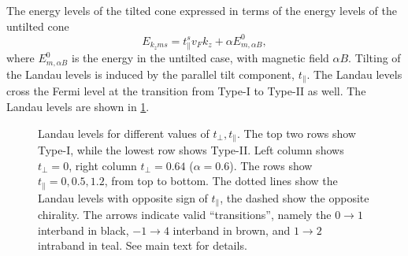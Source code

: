 The energy levels of the tilted cone expressed in terms of the energy levels of the untilted cone
\[
E_{k_z m s} = t^s_{\parallel} v_F k_z + \alpha E^0_{m, \alpha B},
\]
where \( E^0_{m, \alpha B} \) is the energy in the untilted case, with magnetic field \( \alpha B \).
Tilting of the Landau levels is induced by the parallel tilt component, \( t_\parallel \).
The Landau levels cross the Fermi level at the transition from Type-I to Type-II as well.
The Landau levels are shown in \cref{fig:llevelstilt}.


\begin{figure}[p!]
  \centering
  \resizebox{\textwidth}{!}{
  
  }
  \caption{\label{fig:llevelstilt}Landau levels for different values of \( t_\perp, t_\parallel \).
    The top two rows show Type-I, while the lowest row shows Type-II.
    Left column shows \( t_\perp = 0 \), right column \( t_\perp = 0.64 \) (\( \alpha = 0.6 \)).
    The rows show \( t_\parallel = 0, 0.5, 1.2 \), from top to bottom.
    The dotted lines show the Landau levels with opposite sign of \( t_\parallel \), the dashed show the opposite chirality.
    The arrows indicate valid ``transitions'', namely the \( 0\to 1 \) interband in black, \( -1 \to 4 \) interband in \textcolor{brown!70!black}{brown}, and \( 1\to 2 \) intraband in \textcolor{teal!70!black}{teal}.
    See main text for details.
  }
\end{figure}

